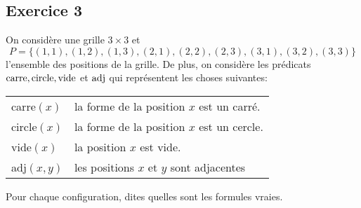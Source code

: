 
\subsection*{Exercice 3}
On considère une grille $3 \times 3$ et 
$$
P = \{(1, 1), (1, 2), (1, 3), (2, 1), (2, 2), (2, 3), (3, 1), (3, 2), (3, 3) \}
$$
l'ensemble des positions de la grille. De plus, on considère les prédicats $\text{carre}, \text{circle}, \text{vide}$ et $\text{adj}$ 
qui représentent les choses suivantes:
\vspace{0.2cm}
\begin{center}
\begin{tabular}{| l l |}
\hline
carre$(x)$ & la forme de la position $x$ est un carré. \\
circle$(x)$ & la forme de la position $x$ est un cercle. \\
vide$(x)$ & la position $x$ est vide. \\
adj$(x, y)$ & les positions $x$ et $y$ sont adjacentes \\
\hline
\end{tabular}
\end{center}
\vspace{0.2cm}

Pour chaque configuration, dites quelles sont les formules vraies.

